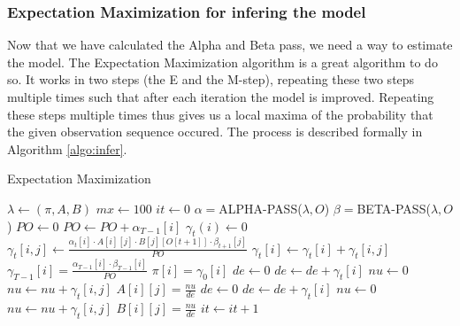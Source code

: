 \documentclass[journal, compsoc]{IEEEtran}
\begin{document}
\subsubsection{Expectation Maximization for infering the model}
Now that we have calculated the Alpha and Beta pass, we need a way to estimate the model. The Expectation Maximization algorithm is a great algorithm to do so. It works in two steps (the E and the M-step),
repeating these two steps multiple times such that after each iteration the model is improved. Repeating these steps multiple times thus gives us a local maxima of the probability that the given observation
sequence occured. The process is described formally in Algorithm \ref{algo:infer}.
\begin{algorithm}
\caption{Expectation Maximization}\label{algo:infer}
\begin{algorithmic}[1]
 
\State $\lambda \gets (\pi, A, B)$
\State $mx \gets 100$ 
\State $it \gets 0$
\State $\alpha = $ALPHA-PASS($\lambda, O$)
\State $\beta = $BETA-PASS($\lambda, O$)
\State $PO \gets 0$
 
\State $PO \gets PO + \alpha_{T - 1}[i]$
\EndFor
{}
\State $\gamma_t(i) \gets 0$
\State $\gamma_t[i, j] \gets \frac{\alpha_t[i]\cdot A[i][j] \cdot B[j][O[t + 1]] \cdot \beta_{t + 1}[j]}{PO}$
\State $\gamma_t[i] \gets \gamma_t[i] + \gamma_t[i, j]$
\EndFor
\EndFor
\EndFor
{} 
\State $\gamma_{T - 1}[i] = \frac{\alpha_{T - 1}[i]\cdot \beta_{T - 1}[i]}{PO}$
\EndFor
{} 
\State $\pi[i] = \gamma_0[i]$
\EndFor
{} 
\State $de \gets 0$
\State $de \gets de + \gamma_t[i]$
\EndFor
{}
\State $nu \gets 0$
\State $nu \gets nu + \gamma_t[i, j]$
\EndFor
\State $A[i][j] = \frac{nu}{de}$
\EndFor
\EndFor
{} 
\State $de \gets 0$
\State $de \gets de + \gamma_t[i]$
\EndFor
{}
\State $nu \gets 0$
\State $nu \gets nu + \gamma_t[i, j]$
\EndIf
\EndFor
\State $B[i][j] = \frac{nu}{de}$
\EndFor
\EndFor
\State $it \gets it + 1$
\EndWhile
\EndProcedure
\end{algorithmic}
\end{algorithm}
\end{document}
